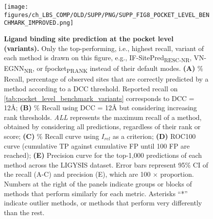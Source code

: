 \begin{figure}[ht!]
    \centering
    \texttt{[image: figures/ch\_LBS\_COMP/OLD/SUPP/PNG/SUPP\_FIG8\_POCKET\_LEVEL\_BENCHMARK\_IMPROVED.png]}
    \caption[Ligand binding site prediction at the pocket level (variants)]{\textbf{Ligand binding site prediction at the pocket level (variants).} Only the top-performing, i.e., highest recall, variant of each method is drawn on this figure, e.g., IF-SitePred\textsubscript{RESC-NR}, VN-EGNN\textsubscript{NR}, or fpocket\textsubscript{PRANK} instead of their default modes. \textbf{(A)} \% Recall, percentage of observed sites that are correctly predicted by a method according to a DCC threshold. Reported recall on \autoref{tab:pocket_level_benchmark_variants} corresponds to DCC = 12\AA{}; \textbf{(B)} \% Recall using DCC = 12\AA{} but considering increasing rank thresholds. \textit{ALL} represents the maximum recall of a method, obtained by considering all predictions, regardless of their rank or score; \textbf{(C)} \% Recall curve using $I_{rel}$ as a criterion; \textbf{(D)} ROC100 curve (cumulative TP against cumulative FP until 100 FP are reached); \textbf{(E)} Precision curve for the top-1,000 predictions of each method across the LIGYSIS dataset. Error bars represent 95\% CI of the recall (A-C) and precision (E), which are 100 $\times$ proportion. Numbers at the right of the panels indicate groups or blocks of methods that perform similarly for each metric. Asterisks ``*'' indicate outlier methods, or methods that perform very differently than the rest.}
    \label{fig:pocket_level_benchmark_variants}
\end{figure}


